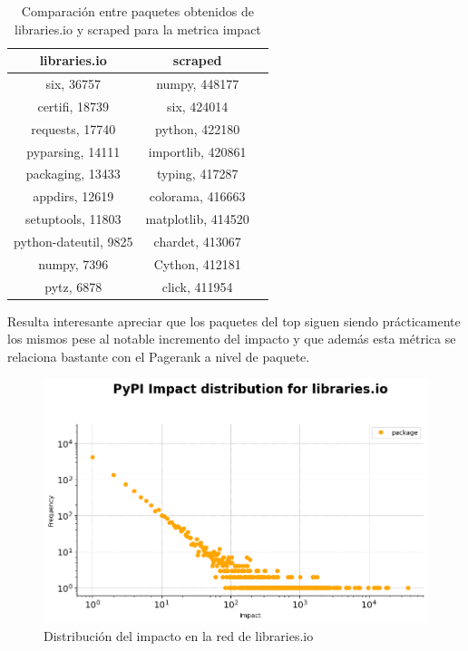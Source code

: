 \begin{table}[h!]
    \centering
    \caption{Comparación entre paquetes obtenidos de libraries.io y scraped para la metrica impact}
    \begin{tabular}{|c|c|c|}
        \hline
        \textbf{libraries.io} & \textbf{scraped}   \\
        \hline
        six, 36757            & numpy, 448177      \\
        certifi, 18739        & six, 424014        \\
        requests, 17740       & python, 422180     \\
        pyparsing, 14111      & importlib, 420861  \\
        packaging, 13433      & typing, 417287     \\
        appdirs, 12619        & colorama, 416663   \\
        setuptools, 11803     & matplotlib, 414520 \\
        python-dateutil, 9825 & chardet, 413067    \\
        numpy, 7396           & Cython, 412181     \\
        pytz, 6878            & click, 411954      \\
        \hline
    \end{tabular}
\end{table}


Resulta interesante apreciar que los paquetes del top siguen siendo prácticamente los mismos
pese al notable incremento del impacto y que además esta métrica se relaciona bastante con el
Pagerank a nivel de paquete.

\begin{figure}[h!]
    \begin{center}
        \includegraphics[width=1\textwidth]{img/pypi/librariesio_impact_distribution.png}
        \caption{Distribución del impacto en la red de libraries.io}
        \label{fig:Distribución del impacto en la red de libraries.io}
    \end{center}
\end{figure}

